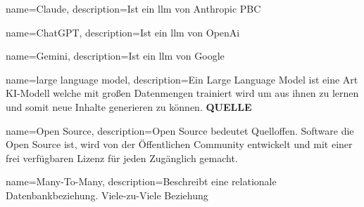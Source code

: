{
        name=Claude,
        description={Ist ein \acs{llm} von Anthropic PBC}
}

{
        name=ChatGPT,
        description={Ist ein \acs{llm} von OpenAi}
}

{
        name=Gemini,
        description={Ist ein \acs{llm} von Google}
}

{
        name=large language model,
        description={Ein Large Language Model ist eine Art KI-Modell welche mit großen Datenmengen trainiert wird um aus ihnen zu lernen und somit neue Inhalte generieren zu können. \textbf{QUELLE}}
}

{
        name=Open Source,
        description={Open Source bedeutet Quelloffen. Software die Open Source ist, wird von der Öffentlichen Community entwickelt und mit einer frei verfügbaren Lizenz für jeden Zugänglich gemacht.}
}

{
        name=Many-To-Many,
        description={Beschreibt eine relationale Datenbankbeziehung. Viele-zu-Viele Beziehung}
}




